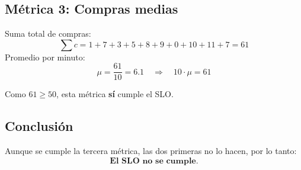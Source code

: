 \subsection{Métrica 3: Compras medias}\label{subsec:metrica-3:-compras-medias}
Suma total de compras:
\[
    \sum c = 1 + 7 + 3 + 5 + 8 + 9 + 0 + 10 + 11 + 7 = 61
\]
Promedio por minuto:
\[
    \mu = \frac{61}{10} = 6.1\quad\Rightarrow\quad 10 \cdot \mu = 61
\]
\begin{solucion}[title=parte 3]

    Como $61 \geq 50$, esta métrica \textbf{sí} cumple el SLO\@.
\end{solucion}
\begin{solucion}
    \subsection*{Conclusión}
    Aunque se cumple la tercera métrica, las dos primeras no lo hacen, por lo tanto:
    \[
        \textbf{El SLO no se cumple.}
    \]
\end{solucion}